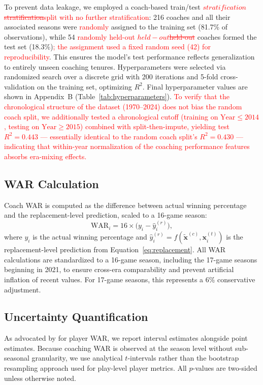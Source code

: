 \documentclass[USenglish]{article}
\newcommand{\rev}[1]{\textcolor{red}{#1}}
\newcommand{\del}[1]{\textcolor{red}{\ifmmode\mbox{\sout{\ensuremath{#1}}}\else\sout{#1}\fi}}
\theoremstyle{dgthm}
\theoremstyle{dgdef}
\begin{document}
To prevent data leakage, we employed a coach-based train/test \del{stratification}\rev{split with no further stratification}: 216 coaches and all their associated seasons were \rev{randomly }assigned to the training set (81.7\% of observations), while 54 \rev{randomly held-out }\del{held-out }coaches formed the test set (18.3\%)\rev{; the assignment used a fixed random seed (42) for reproducibility}. This ensures the model's test performance reflects generalization to entirely unseen coaching tenures. Hyperparameters were selected via randomized search over a discrete grid with 200 iterations and 5-fold cross-validation on the training set, optimizing $R^2$. Final hyperparameter values are shown in Appendix~B (Table~\ref{tab:hyperparameters}). \rev{To verify that the chronological structure of the dataset (1970--2024) does not bias the random coach split, we additionally tested a chronological cutoff (training on $\text{Year} \leq 2014$, testing on $\text{Year} \geq 2015$) combined with split-then-impute, yielding test $R^2 = 0.443$ --- essentially identical to the random coach split's $R^2 = 0.430$ --- indicating that within-year normalization of the coaching performance features absorbs era-mixing effects.}

\subsection{WAR Calculation}

Coach WAR is computed as the difference between actual winning percentage and the replacement-level prediction, scaled to a 16-game season:
\begin{equation}
\text{WAR}_i = 16 \times \bigl(y_i - \hat{y}_i^{(r)}\bigr),
\label{eq:war}
\end{equation}
where $y_i$ is the actual winning percentage and $\hat{y}_i^{(r)} = f(\tilde{\mathbf{x}}^{(c)}, \mathbf{x}_i^{(t)})$ is the replacement-level prediction from Equation~\ref{eq:replacement}. All WAR calculations are standardized to a 16-game season, including the 17-game seasons beginning in 2021, to ensure cross-era comparability and prevent artificial inflation of recent values. For 17-game seasons, this represents a 6\% conservative adjustment.

\subsection{Uncertainty Quantification}

As advocated by \citet{baumer2015} for player WAR, we report interval estimates alongside point estimates. Because coaching WAR is observed at the season level without sub-seasonal granularity, we use analytical $t$-intervals rather than the bootstrap resampling approach used for play-level player metrics. All $p$-values are two-sided unless otherwise noted.
\end{document}
